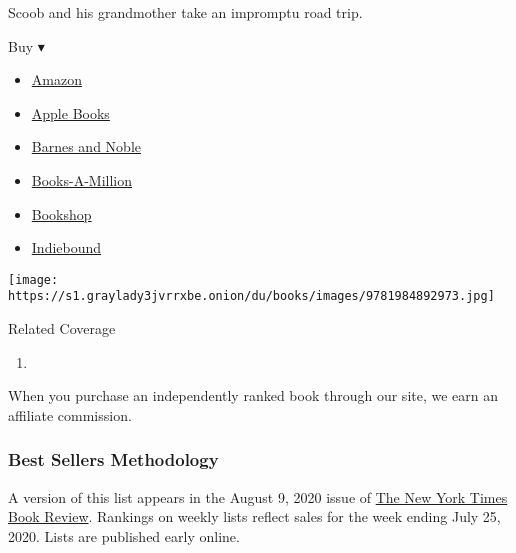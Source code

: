 \begin{enumerate}
  Scoob and his grandmother take an impromptu road trip.

  Buy ▾

  \begin{itemize}
  \tightlist
  \item
    \href{https://www.amazon.com/Clean-Getaway-Nic-Stone/dp/1984892975?tag=NYTBS-20}{Amazon}
  \item
    \href{https://du-gae-books-dot-nyt-du-prd.appspot.com/buy?title=CLEAN+GETAWAY\&author=Nic+Stone}{Apple
    Books}
  \item
    \href{https://www.anrdoezrs.net/click-7990613-11819508?url=https\%3A\%2F\%2Fwww.barnesandnoble.com\%2Fw\%2F\%3Fean\%3D9781984892973}{Barnes
    and Noble}
  \item
    \href{https://www.anrdoezrs.net/click-7990613-35140?url=https\%3A\%2F\%2Fwww.booksamillion.com\%2Fp\%2FCLEAN\%2BGETAWAY\%2FNic\%2BStone\%2F9781984892973}{Books-A-Million}
  \item
    \href{https://bookshop.org/a/3546/9781984892973}{Bookshop}
  \item
    \href{https://www.indiebound.org/book/9781984892973?aff=NYT}{Indiebound}
  \end{itemize}

  \texttt{[image: https://s1.graylady3jvrrxbe.onion/du/books/images/9781984892973.jpg]}
\end{enumerate}

Related Coverage

\begin{enumerate}
\def\labelenumi{\arabic{enumi}.}
\tightlist
\item
  \href{https://www.nytimes3xbfgragh.onion/2020/07/31/books/review/the-system-robert-reich-break-em-up-zephyr-teachout.html}{}
\end{enumerate}

When you purchase an independently ranked book through our site, we earn
an affiliate commission.

\hypertarget{best-sellers-methodology}{%
\subsubsection{Best Sellers
Methodology}\label{best-sellers-methodology}}

A version of this list appears in the August 9, 2020 issue of
\href{http://www.nytimes3xbfgragh.onion/section/books/review}{The New
York Times Book Review}. Rankings on weekly lists reflect sales for the
week ending July 25, 2020. Lists are published early online.

